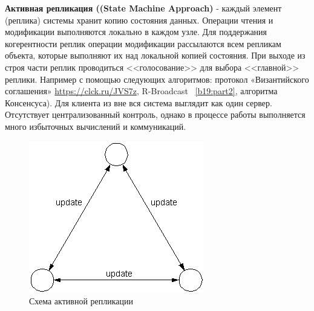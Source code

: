 \textbf{Активная репликация ((State Machine Approach)} - каждый элемент (реплика) системы хранит копию состояния данных. Операции чтения и модификации выполняются локально в каждом узле. Для поддержания когерентности реплик операции модификации рассылаются всем репликам объекта, которые выполняют их над локальной копией состояния. При выходе из строя части реплик проводиться <<голосование>> для выбора <<главной>> реплики. Например с помощью следующих алгоритмов: протокол «Византийского соглашения» \url{https://clck.ru/JVS7z}, R-Broadcast ~\ref{b19:part2}, алгоритма Консенсуса). Для клиента из вне вся система выглядит как один сервер. Отсутствует централизованный контроль, однако в процессе работы выполняется много избыточных вычислений и коммуникаций.
\begin{figure}[H]
	\centering
	\includegraphics[scale = 0.7]{24/active.png}
	\caption{Схема активной репликации}
	\label{fig:active_repl}
\end{figure}

